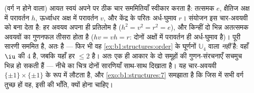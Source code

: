 \begin{example}\label{ex:b1:structures:klein}
(वर्ग न होने वाला) आयत स्वयं अपने पर ठीक चार सममितियाँ स्वीकार करता है:
तत्समक $e$, क्षैतिज अक्ष में परावर्तन $h$, ऊर्ध्वाधर अक्ष में परावर्तन $v$,
और केंद्र के परितः अर्ध-घुमाव $r$। संयोजन इस चार-अवयवी  को  बना
देता है: हर अवयव अपना ही प्रतिलोम है ($h^2 = v^2 = r^2 = e$), और किन्हीं दो
भिन्न अतत्समक अवयवों का गुणनफल तीसरा होता है ($hv = vh = r$: दोनों अक्षों
में परावर्तन ही अर्ध-घुमाव है)। पूरी सारणी सममित है, अतः   है ---
फिर भी वह \cref{ex:b1:structures:order} के घूर्णनों $\mathbb U_4$ वाला 
\emph{नहीं} है: वहाँ $\iu$ की  $4$ है, जबकि यहाँ हर  $\leq
2$ है। अतः एक ही आकार के दो समूहों की गुणन-संरचनाएँ सचमुच भिन्न हो सकती हैं
--- नीचे का चित्र दोनों सारणियाँ साथ-साथ दिखाता है। यह चार-अवयवी 
$\{\pm1\} \times \{\pm1\}$ के रूप में लौटता है, और
\cref{exo:b1:structures:7} समझाता है कि जिस  में सभी वर्ग तुच्छ हों वह,
इसी की भाँति,  क्यों होना चाहिए।
\end{example}

